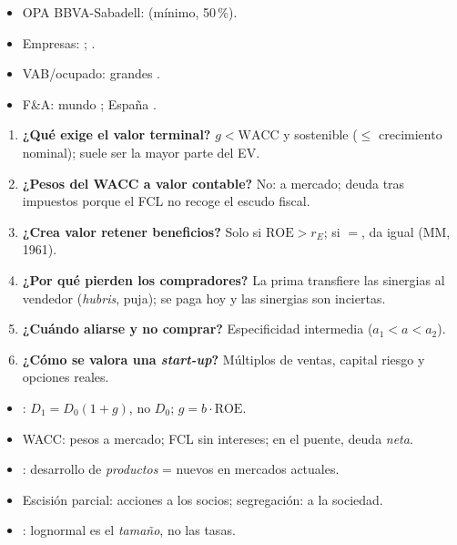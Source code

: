 \documentclass{article}
\begin{document}
\begin{columnas}
\anexorepaso
{}
\begin{itemize}
\item OPA BBVA-Sabadell:  (mínimo, 50\,\%).
\item Empresas: ; .
\item VAB/ocupado: grandes .
\item F\&A: mundo ; España .
\end{itemize}
\begin{enumerate}
\item \textbf{¿Qué exige el valor terminal?} $g<\mathrm{WACC}$ y sostenible ($\leq$ crecimiento nominal); suele ser la mayor parte del EV.
\item \textbf{¿Pesos del WACC a valor contable?} No: a mercado; deuda tras impuestos porque el FCL no recoge el escudo fiscal.
\item \textbf{¿Crea valor retener beneficios?} Solo si $\mathrm{ROE}>r_E$; si $=$, da igual (MM, 1961).
\item \textbf{¿Por qué pierden los compradores?} La prima transfiere las sinergias al vendedor (\emph{hubris}, puja); se paga hoy y las sinergias son inciertas.
\item \textbf{¿Cuándo aliarse y no comprar?} Especificidad intermedia ($a_1<a<a_2$).
\item \textbf{¿Cómo se valora una \emph{start-up}?} Múltiplos de ventas, capital riesgo y opciones reales.
\end{enumerate}
\begin{trampa}
\begin{itemize}
\item {}: $D_1=D_0(1+g)$, no $D_0$; $g=b\cdot\mathrm{ROE}$.
\item WACC: pesos a mercado; FCL sin intereses; en el puente, deuda \emph{neta}.
\item {}: desarrollo de \emph{productos} = nuevos en mercados actuales.
\item Escisión parcial: acciones a los socios; segregación: a la sociedad.
\item {}: lognormal es el \emph{tamaño}, no las tasas.
\end{itemize}
\end{trampa}

\end{columnas}
\end{document}
